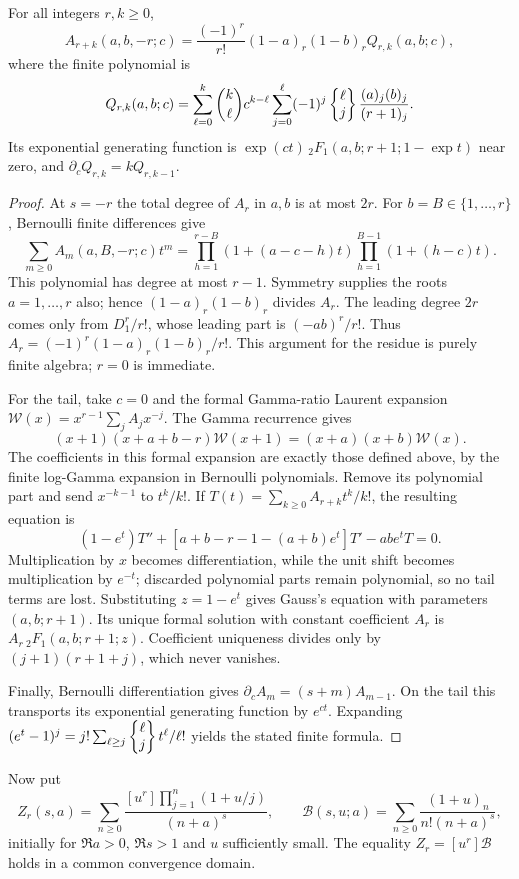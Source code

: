 \begin{theorem}
\label{agrc-add:tail}
For all integers $r,k\geq0$,
\[
 A_{r+k}(a,b,-r;c)=\frac{(-1)^r}{r!}(1-a)_r(1-b)_r Q_{r,k}(a,b;c),
\]
where the finite polynomial is
\[
 Q_{r,k}(a,b;c)=\sum_{\ell=0}^k\binom{k}{\ell}c^{k-\ell}
       \sum_{j=0}^{\ell}(-1)^j\left\{\begin{matrix}\ell\\j\end{matrix}\right\}
                         \frac{(a)_j(b)_j}{(r+1)_j}.
\]
Its exponential generating function is
$\exp(ct)\,{}_2F_1(a,b;r+1;1-\exp t)$ near zero, and
$\partial_cQ_{r,k}=kQ_{r,k-1}$.
\end{theorem}
\begin{proof}
At $s=-r$ the total degree of $A_r$ in $a,b$ is at most $2r$.
For $b=B\in\{1,\ldots,r\}$, Bernoulli finite differences give
\[
 \sum_{m\geq0}A_m(a,B,-r;c)t^m
  =\prod_{h=1}^{r-B}(1+(a-c-h)t)
        \prod_{h=1}^{B-1}(1+(h-c)t).
\]
This polynomial has degree at most $r-1$. Symmetry supplies the roots
$a=1,\ldots,r$ also; hence $(1-a)_r(1-b)_r$ divides $A_r$.
The leading degree $2r$ comes only from $D_1^r/r!$, whose leading part
is $(-ab)^r/r!$. Thus $A_r=(-1)^r(1-a)_r(1-b)_r/r!$.
This argument for the residue is purely finite algebra; $r=0$ is immediate.

For the tail, take $c=0$ and the formal Gamma-ratio Laurent expansion
$\mathcal W(x)=x^{r-1}\sum_j A_jx^{-j}$. The Gamma recurrence gives
\[
 (x+1)(x+a+b-r)\mathcal W(x+1)=(x+a)(x+b)\mathcal W(x).
\]
The coefficients in this formal expansion are exactly those defined
above, by the finite log-Gamma expansion in Bernoulli polynomials.
Remove its polynomial part and send $x^{-k-1}$ to $t^k/k!$.
If $T(t)=\sum_{k\geq0}A_{r+k}t^k/k!$, the resulting equation is
\[
 (1-e^t)T''+[a+b-r-1-(a+b)e^t]T'-ab e^tT=0.
\]
Multiplication by $x$ becomes differentiation, while the unit shift
becomes multiplication by $e^{-t}$; discarded polynomial parts remain
polynomial, so no tail terms are lost. Substituting $z=1-e^t$ gives
Gauss's equation with parameters $(a,b;r+1)$. Its unique formal solution
with constant coefficient $A_r$ is
$A_r\,{}_2F_1(a,b;r+1;z)$. Coefficient uniqueness divides only by
$(j+1)(r+1+j)$, which never vanishes.

Finally, Bernoulli differentiation gives
$\partial_c A_m=(s+m)A_{m-1}$. On the tail this transports its
exponential generating function by $e^{ct}$. Expanding
$(e^t-1)^j=j!\sum_{\ell\geq j}\left\{\begin{matrix}\ell\\j\end{matrix}\right\}t^\ell/\ell!$
yields the stated finite formula.
\end{proof}

Now put
\[
 Z_r(s,a)=\sum_{n\geq0}\frac{[u^r]\prod_{j=1}^n(1+u/j)}{(n+a)^s},
 \qquad
 \mathcal B(s,u;a)=\sum_{n\geq0}\frac{(1+u)_n}{n!(n+a)^s},
\]
initially for $\Re a>0$, $\Re s>1$ and $u$ sufficiently small.
The equality $Z_r=[u^r]\mathcal B$ holds in a common convergence domain.

